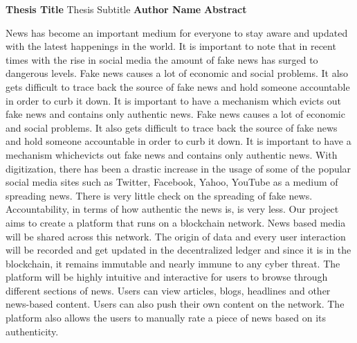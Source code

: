\documentclass[10pt,a4paper]{article}
\begin{document}
\thispagestyle{plain}
\begin{center}
\Large
\textbf{Thesis Title}
\vspace{0.4cm}
\large
Thesis Subtitle
\vspace{0.4cm}
\textbf{Author Name}
\vspace{0.9cm}
\textbf{Abstract}
\end{center}
News has become an important medium for everyone to stay aware and updated
with the latest happenings in the world. It is important to note that in recent times
with the rise in social media the amount of fake news has surged to dangerous
levels. Fake news causes a lot of economic and social problems. It also gets
difficult to trace back the source of fake news and hold someone accountable in
order to curb it down. It is important to have a mechanism which evicts out fake
news and contains only authentic news.
Fake news causes a lot of economic and social problems. It also gets difficult to
trace back the source of fake news and hold someone accountable in order to curb
it down. It is important to have a mechanism whichevicts out fake news and
contains only authentic news. With digitization, there has been a drastic increase in
the usage of some of the popular social media sites such as Twitter, Facebook,
Yahoo, YouTube as a medium of spreading news. There is very little check on the
spreading of fake news. Accountability, in terms of how authentic the news is, is
very less.
Our project aims to create a platform that runs on a blockchain network. News
based media will be shared across this network. The origin of data and every user
interaction will be recorded and get updated in the decentralized ledger and since it
is in the blockchain, it remains immutable and nearly immune to any cyber threat.
The platform will be highly intuitive and interactive for users to browse through
different sections of news. Users can view articles, blogs, headlines and other
news-based content. Users can also push their own content on the network. The
platform also allows the users to manually rate a piece of news based on its
authenticity.
\end{document}
